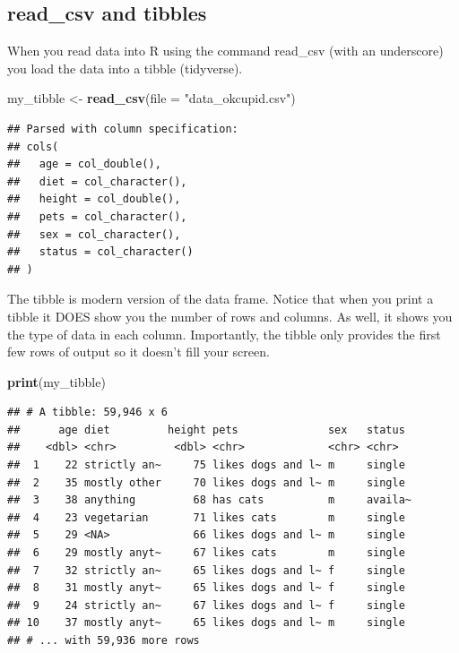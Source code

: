 \documentclass[
]{krantz}
\makeatletter
\newenvironment{Shaded}{\begin{snugshade}}{\end{snugshade}}
\newcommand{\DataTypeTok}[1]{\textcolor[rgb]{0.27,0.27,0.27}{#1}}
\newcommand{\KeywordTok}[1]{\textcolor[rgb]{0.27,0.27,0.27}{\textbf{#1}}}
\newcommand{\NormalTok}[1]{#1}
\newcommand{\StringTok}[1]{\textcolor[rgb]{0.5,0.5,0.5}{#1}}
\newenvironment{kframe}{%
\medskip{}
\setlength{\fboxsep}{.8em}
 \def\at@end@of@kframe{}%
 \ifinner\ifhmode%
  \def\at@end@of@kframe{\end{minipage}}%
  \begin{minipage}{\columnwidth}%
 \fi\fi%
 \def\FrameCommand##1{\hskip\@totalleftmargin \hskip-\fboxsep
 \colorbox{shadecolor}{##1}\hskip-\fboxsep
     \hskip-\linewidth \hskip-\@totalleftmargin \hskip\columnwidth}%
 \MakeFramed {\advance\hsize-\width
   \@totalleftmargin\z@ \linewidth\hsize
   \@setminipage}}%
 {\par\unskip\endMakeFramed%
 \at@end@of@kframe}
\renewenvironment{Shaded}{\begin{kframe}}{\end{kframe}}
\makeatother
\begin{document}
\hypertarget{read_csv-and-tibbles}{%
\subsection{read\_csv and tibbles}\label{read_csv-and-tibbles}}

When you read data into R using the command read\_csv (with an underscore) you load the data into a tibble (tidyverse).

\begin{Shaded}
\begin{Highlighting}[]
\NormalTok{my_tibble <-}\StringTok{ }\KeywordTok{read_csv}\NormalTok{(}\DataTypeTok{file =} \StringTok{"data_okcupid.csv"}\NormalTok{)}
\end{Highlighting}
\end{Shaded}

\begin{verbatim}
## Parsed with column specification:
## cols(
##   age = col_double(),
##   diet = col_character(),
##   height = col_double(),
##   pets = col_character(),
##   sex = col_character(),
##   status = col_character()
## )
\end{verbatim}

The tibble is modern version of the data frame. Notice that when you print a tibble it DOES show you the number of rows and columns. As well, it shows you the type of data in each column. Importantly, the tibble only provides the first few rows of output so it doesn't fill your screen.

\begin{Shaded}
\begin{Highlighting}[]
\KeywordTok{print}\NormalTok{(my_tibble)}
\end{Highlighting}
\end{Shaded}

\begin{verbatim}
## # A tibble: 59,946 x 6
##      age diet         height pets              sex   status 
##    <dbl> <chr>         <dbl> <chr>             <chr> <chr>  
##  1    22 strictly an~     75 likes dogs and l~ m     single 
##  2    35 mostly other     70 likes dogs and l~ m     single 
##  3    38 anything         68 has cats          m     availa~
##  4    23 vegetarian       71 likes cats        m     single 
##  5    29 <NA>             66 likes dogs and l~ m     single 
##  6    29 mostly anyt~     67 likes cats        m     single 
##  7    32 strictly an~     65 likes dogs and l~ f     single 
##  8    31 mostly anyt~     65 likes dogs and l~ f     single 
##  9    24 strictly an~     67 likes dogs and l~ f     single 
## 10    37 mostly anyt~     65 likes dogs and l~ m     single 
## # ... with 59,936 more rows
\end{verbatim}
\end{document}
